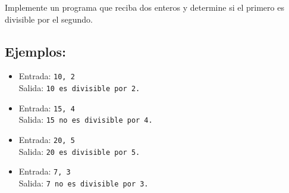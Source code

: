 Implemente un programa que reciba dos enteros y determine si el primero es divisible por el segundo.
\subsection*{Ejemplos:}
\begin{itemize}
    \item Entrada: \texttt{10, 2}\\
          Salida: \texttt{10 es divisible por 2.}
    \item Entrada: \texttt{15, 4}\\
          Salida: \texttt{15 no es divisible por 4.}
    \item Entrada: \texttt{20, 5}\\
          Salida: \texttt{20 es divisible por 5.}
    \item Entrada: \texttt{7, 3}\\
          Salida: \texttt{7 no es divisible por 3.}
\end{itemize}
